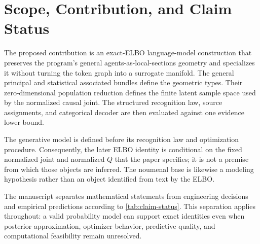 \chapter{Scope, Contribution, and Claim Status}

The proposed contribution is an exact-ELBO language-model construction that preserves the program's general agents-as-local-sections geometry and specializes it without turning the token graph into a surrogate manifold. The general principal and statistical associated bundles define the geometric types. Their zero-dimensional population reduction defines the finite latent sample space used by the normalized causal joint. The structured recognition law, source assignments, and categorical decoder are then evaluated against one evidence lower bound.

The generative model is defined before its recognition law and optimization procedure. Consequently, the later ELBO identity is conditional on the fixed normalized joint and normalized \(Q\) that the paper specifies; it is not a premise from which those objects are inferred. The noumenal base is likewise a modeling hypothesis rather than an object identified from text by the ELBO.

The manuscript separates mathematical statements from engineering decisions and empirical predictions according to \cref{tab:claim-status}. This separation applies throughout: a valid probability model can support exact identities even when posterior approximation, optimizer behavior, predictive quality, and computational feasibility remain unresolved.

